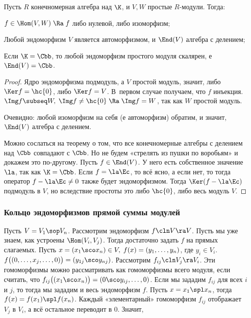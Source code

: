 \documentclass[a4paper]{article}
\begin{document}
\begin{lemma}[Шура]
Пусть $R$ конечномерная алгебра над $\K$, и $V, W$ простые $R$-модули. Тогда:

 $f \in \Hom(V,W) \; \Ra \; f$ либо нулевой, либо изоморфизм;

 Любой эндоморфизм $V$ является автоморфизмом, и $\End(V)$  алгебра с делением;

 Если $\K=\Cbb$, то любой эндоморфизм простого модуля скалярен, е $\End(V)=\Cbb$.
\end{lemma}

\begin{proof}
 Ядро эндоморфизма подмодуль, а $V$ простой модуль, значит, либо $\Ker f =\hc{0}$, либо  $\Ker f =
V$. В~первом случае получаем, что $f$ инъекция. $\Img f \subseq W, \; \Img f \neq \hc{0} \; \Ra \; \Img f
= W$, так как $W$ простой модуль.

 Очевидно: любой изоморфизм на себя (е автоморфизм) обратим, и значит,
$\End(V)$ алгебра с делением.

 Можно сослаться на теорему о том, что все конечномерные алгебры с делением над $\Cbb$ совпадают  с
$\Cbb$. Но не будем «стрелять из пушки по воробьям» и докажем это по-другому. Пусть $f \in \End(V)$. У него
есть собственное значение $\la$, так как $\K=\Cbb$. Если $f=\la \Ec$, то всё ясно, а если нет, то
тогда оператор $f-\la \Ec\neq 0$ также будет эндоморфизмом. Тогда $\Ker(f -\la \Ec)$ подмодуль в
$V$, но вследствие простоты это либо $\hc{0}$, либо весь модуль $V$.
\end{proof}

\subsubsection{Кольцо эндоморфизмов прямой суммы модулей}

Пусть $V=V_1 \sop V_n$. Рассмотрим эндоморфизм $f\cln V \ra V$. Пусть мы уже знаем, как устроены $\Hom(V_i,
V_j)$.  Тогда достаточно задать $f$ на прямых слагаемых. Пусть $x =(x_1 \sco x_n) \in V, \; f(x)=(y_1,
\ldots,y_n)$, где $y_i \in V_i$. $f\bigl((0, \ldots,x_j,\ldots,0)\bigr)=(y_{1j} \sco y_{nj})$. Рассмотрим
$f_{ij}\cln V_j \ra V_i$. Эти гомоморфизмы можно рассматривать как гомоморфизмы всего модуля, если считать, что
$f_{ij}\bigl((x_1 \sco x_n)\bigr)=(0 \sco y_{ij}, \ldots,0)$. Если мы зададим $f_{ij}$ для всех $i$ и $j$, то
тогда мы зададим и весь эндоморфизм $f$. Пусть $x=x_1  \spl  x_n$, тогда $f(x)=f(x_1)  \spl  f(x_n)$. Каждый
«элементарный» гомоморфизм $f_{ij}$ отображает $V_j$ в $V_i$, а всё остальное переводит в 0. Значит,
\end{document}
